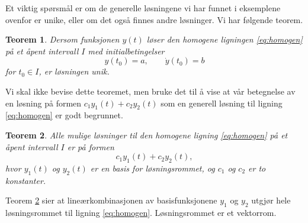 \documentclass{article}
\newtheorem{thm}{Teorem}\surroundwithmdframed{thm}
\theoremstyle{definition}
\theoremstyle{remark}
\newenvironment{merk}
{\pushQED{\qed}\renewcommand{\qedsymbol}{$\triangle$}\merkx}
{\popQED\endmerkx}
\begin{document}
\begin{multicols*}{2}
Et viktig spørsmål er om de generelle løsningene vi har funnet i eksemplene ovenfor er unike, eller om det også finnes andre løsninger. Vi har følgende teorem.

\begin{thm} \label{thm:unik}
  Dersom funksjonen $y(t)$ løser den homogene ligningen \eqref{eq:homogen} på et åpent intervall $I$ med initialbetingelser
  \begin{equation*}
    y(t_0) = a, \qquad \dot{y}(t_0) = b
  \end{equation*}
  for $t_0 \in I$, er løsningen unik.
\end{thm}

Vi skal ikke bevise dette teoremet, men bruke det til å vise at vår betegnelse av en løsning på formen $c_1 y_1(t) + c_2 y_2(t)$ som en generell løsning til ligning \eqref{eq:homogen} er godt begrunnet.

\begin{thm} \label{thm:alle_mulige_losn_homogen}
  Alle mulige løsninger til den homogene ligning \eqref{eq:homogen} på et åpent intervall $I$ er på formen
  \begin{equation*}
    c_1 y_1(t) + c_2 y_2(t),
  \end{equation*}
  hvor $y_1(t)$ og $y_2(t)$ er en basis for løsningsrommet, og $c_1$ og $c_2$ er to konstanter.
\end{thm}

\begin{merk}
  Teorem \ref{thm:alle_mulige_losn_homogen} sier at lineærkombinasjonen av basisfunksjonene $y_1$ og $y_2$ utgjør hele løsningsrommet til ligning \eqref{eq:homogen}. Løsningsrommet er et vektorrom.
\end{merk}


\end{multicols*}
\end{document}
